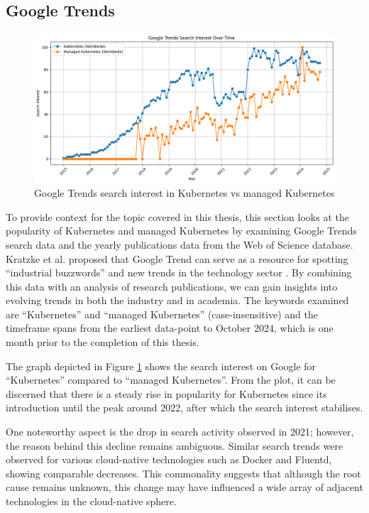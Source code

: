 \subsection{Google Trends}

\FloatBarrier  

\begin{figure}
    \centering
    \includegraphics[width=1\linewidth]{resources/d2a89eeeda76d50039bc6f5d3a97c41b.png}
    \caption{Google Trends search interest in Kubernetes vs managed Kubernetes}
    \label{fig:search-interests-kubernetes-vs-managed-kubernetes}
\end{figure}

To provide context for the topic covered in this thesis, this section looks at the popularity of Kubernetes and managed Kubernetes by examining Google Trends search data and the yearly publications data from the Web of Science database. Kratzke et al. proposed that Google Trend can serve as a resource for spotting “industrial buzzwords” and new trends in the technology sector \cite{kratzkeUnderstandingCloudnativeApplications2017}. By combining this data with an analysis of research publications, we can gain insights into evolving trends in both the industry and in academia. The keywords examined are “Kubernetes” and “managed Kubernetes” (case-insensitive) and the timeframe spans from the earliest data-point to October 2024, which is one month prior to the completion of this thesis.

The graph depicted in Figure \ref{fig:search-interests-kubernetes-vs-managed-kubernetes} shows the search interest on Google for “Kubernetes” compared to “managed Kubernetes”. From the plot, it can be discerned that there is a steady rise in popularity for Kubernetes since its introduction until the peak around 2022, after which the search interest stabilises.

One noteworthy aspect is the drop in search activity observed in 2021; however, the reason behind this decline remains ambiguous. Similar search trends were observed for various cloud-native technologies such as Docker and Fluentd, showing comparable decreases. This commonality suggests that although the root cause remains unknown, this change may have influenced a wide array of adjacent technologies in the cloud-native sphere.

